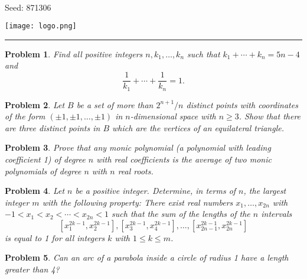 \documentclass[12pt]{article}
\newtheorem{opg}{Problem}
\begin{document}
\parbox{0.6\textwidth}{ \\[2ex] {\Large Seed: 871306}}
\parbox{0.4\textwidth}{\texttt{[image: logo.png]}}

\hrule

\begin{opg}
Find all positive integers $n, k_1, \dots, k_n$ such that
$k_1 + \cdots + k_n = 5n-4$ and
\[
\frac{1}{k_1} + \cdots + \frac{1}{k_n} = 1.
\]

\end{opg}
\begin{opg}
Let $B$ be a set of more than $2^{n+1}/n$ distinct points with
coordinates
of the form $(\pm 1,\pm 1,\ldots,\pm 1)$ in $n$-dimensional space with
$n\geq 3$.
Show that there are three distinct points in $B$ which are the vertices of
an
equilateral triangle.

\end{opg}
\begin{opg}
Prove that any monic polynomial (a polynomial with leading coefficient 1) of degree $n$ with real coefficients is the average of two monic polynomials of degree $n$ with $n$ real roots.


\end{opg}
\begin{opg}
Let $n$ be a positive integer. Determine, in terms of $n$, the largest integer $m$ with the following property: There exist real numbers $x_1,\dots,x_{2n}$ with $-1 < x_1 < x_2 < \cdots < x_{2n} < 1$ such that the sum of the lengths of the $n$ intervals
\[
[x_1^{2k-1}, x_2^{2k-1}], [x_3^{2k-1},x_4^{2k-1}], \dots, [x_{2n-1}^{2k-1}, x_{2n}^{2k-1}]
\]
is equal to 1 for all integers $k$ with $1 \leq k \leq m$.

\end{opg}
\begin{opg}
Can an arc of a parabola inside a circle of radius 1 have a length
greater than 4?

\end{opg}
\end{document}
